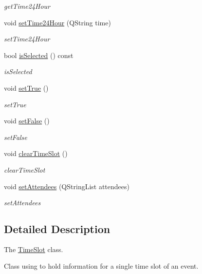 \begin{DoxyCompactItemize}
\begin{DoxyCompactList}\small\item\em get\+Time24\+Hour \end{DoxyCompactList}\item 
void \hyperlink{class_time_slot_aa095348bd53bd45ca4797181e6927ea4}{set\+Time24\+Hour} (Q\+String time)
\begin{DoxyCompactList}\small\item\em set\+Time24\+Hour \end{DoxyCompactList}\item 
bool \hyperlink{class_time_slot_a7448b6ba71a8b1107dffa98365d593aa}{is\+Selected} () const
\begin{DoxyCompactList}\small\item\em is\+Selected \end{DoxyCompactList}\item 
void \hyperlink{class_time_slot_aa063569ec2bc23d252a6eacab8f183fc}{set\+True} ()
\begin{DoxyCompactList}\small\item\em set\+True \end{DoxyCompactList}\item 
void \hyperlink{class_time_slot_adb02c968ee765b49136f051a9ea43b06}{set\+False} ()
\begin{DoxyCompactList}\small\item\em set\+False \end{DoxyCompactList}\item 
void \hyperlink{class_time_slot_ab955b538853b38792c502f30beea5d9b}{clear\+Time\+Slot} ()
\begin{DoxyCompactList}\small\item\em clear\+Time\+Slot \end{DoxyCompactList}\item 
void \hyperlink{class_time_slot_a6a28b7702ca5df07ddaf5e25d37b1bd1}{set\+Attendees} (Q\+String\+List attendees)
\begin{DoxyCompactList}\small\item\em set\+Attendees \end{DoxyCompactList}\end{DoxyCompactItemize}


\subsection{Detailed Description}
The \hyperlink{class_time_slot}{Time\+Slot} class. 

Class using to hold information for a single time slot of an event. 


